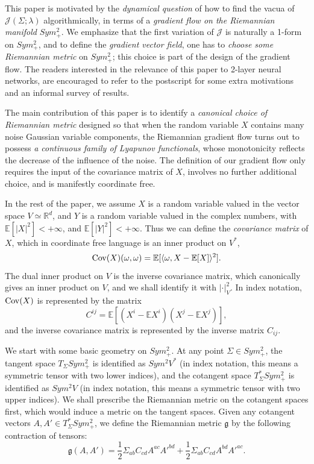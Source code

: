 \documentclass[a4paper]{article}
\newcommand{\Cov}{{\rm Cov}}
\theoremstyle{definition}
\newcommand{\R}{\mathbb{R}}
\newcommand{\E}{\mathbb{E}}
\newcommand{\1}{\mathbbm{1}}
\begin{document}
	
	
	
	
	This paper is motivated by the \emph{dynamical question} of how to find the vacua of $\mathcal{J}(\Sigma;\lambda)$ algorithmically,  in terms of a \emph{gradient flow on the Riemannian manifold} $Sym^2_+$. We emphasize that the first variation of $\mathcal{J}$ is naturally a 1-form on $Sym^2_+$, and to define the \emph{gradient vector field}, one has to \emph{choose some Riemannian metric} on $Sym_+^2$; this choice is part of the design of the gradient flow. The readers interested in the relevance of this paper to 2-layer neural networks, are encouraged to refer to the postscript for some extra motivations and an informal survey of results.
	
	
	
	
	
	
	
	
	The main contribution of this paper is to identify a \emph{canonical choice of Riemannian metric}  designed so that when the random variable $X$ contains many noise Gaussian variable components, the Riemannian gradient flow turns out to possess \emph{a continuous family of Lyapunov functionals}, whose monotonicity reflects the decrease of the influence of the noise. The definition of our gradient flow only requires the input of the covariance matrix of $X$, involves no further additional choice, and is manifestly coordinate free. 
	
	
	
	
	
	In the rest of the paper, we assume $X$ is a random variable valued in the vector space $V\simeq \R^d$, and $Y$ is a random variable valued in the complex numbers, with $\E[|X|^2]<+\infty$, and $\E[|Y|^2]<+\infty$. Thus we can define the \emph{covariance matrix} of $X$, which in coordinate free language is an inner product on $V^*$,
	\[
	\Cov(X)(\omega,\omega)= \E[\langle \omega, X- \E[X]\rangle^2].
	\]
	The dual inner product on $V$ is the inverse covariance matrix, which canonically gives an inner product on $V$, and we shall identify it with $|\cdot|_V^2$. In index notation, $\Cov(X)$ is represented by the matrix
	\[
	C^{ij}= \E[(X^i-\E X^i)( X^j-\E X^j) ] ,
	\]
	and the inverse covariance matrix is represented by the inverse matrix $C_{ij}$. 
	
	
	
	We start with some basic geometry on $Sym^2_+$. At any point $\Sigma\in Sym^2_+$, the tangent space $T_\Sigma Sym^2_+$ is identified as $Sym^2 V^*$ (in index notation, this means a symmetric tensor with two lower indices), and the cotangent space $T_\Sigma^* Sym^2_+$ is identified as $Sym^2 V$ (in index notation, this means a symmetric tensor with two upper indices). We shall prescribe the Riemannian metric on the cotangent spaces first, which would induce a metric on the tangent spaces. Given any cotangent vectors $A, A'\in T_\Sigma^* Sym^2_+$, we define the Riemannian metric $\mathfrak{g}$ by the following contraction of tensors:
	\begin{equation}\label{eqn:Riemannianmetric}
		\mathfrak{g}(A, A')=\frac{1}{2} \Sigma_{ab} C_{cd} A^{ac} A'^{bd} + \frac{1}{2} \Sigma_{ab} C_{cd} A^{bd} A'^{ac}.
	\end{equation}
	
\end{document}
